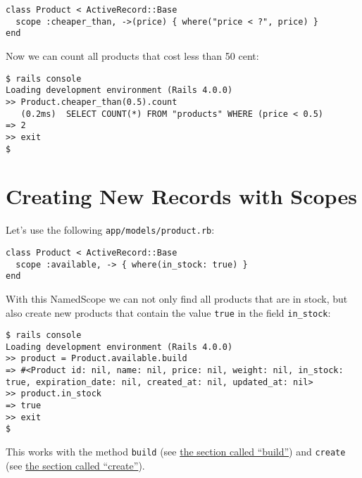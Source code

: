 \documentclass[a4paper]{book}
\begin{document}
\begin{shaded}\begin{verbatim}
class Product < ActiveRecord::Base
  scope :cheaper_than, ->(price) { where("price < ?", price) }
end
\end{verbatim}\end{shaded}

Now we can count all products that cost less than 50 cent:

\begin{shaded}\begin{verbatim}
$ rails console
Loading development environment (Rails 4.0.0)
>> Product.cheaper_than(0.5).count
   (0.2ms)  SELECT COUNT(*) FROM "products" WHERE (price < 0.5)
=> 2
>> exit
$
\end{verbatim}\end{shaded}

\section{Creating New Records with Scopes}\label{creating-new-records-with-scopes}

Let's use the following \texttt{app/models/product.rb}:

\begin{shaded}\begin{verbatim}
class Product < ActiveRecord::Base
  scope :available, -> { where(in_stock: true) }
end
\end{verbatim}\end{shaded}

With this NamedScope we can not only find all products that are in stock, but also create new products that contain the value \texttt{true} in the field \texttt{in\_stock}:

\begin{shaded}\begin{verbatim}
$ rails console
Loading development environment (Rails 4.0.0)
>> product = Product.available.build
=> #<Product id: nil, name: nil, price: nil, weight: nil, in_stock: true, expiration_date: nil, created_at: nil, updated_at: nil>
>> product.in_stock
=> true
>> exit
$
\end{verbatim}\end{shaded}

This works with the method \texttt{build} (see \hyperref[activerecordux5fhinzufuegenux5fbuild]{the section called “build”}) and \texttt{create} (see \hyperref[activerecordux5fcreate]{the section called “create”}).
\end{document}
